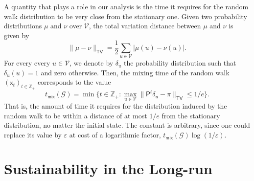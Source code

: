 \documentclass[letterpaper,11pt]{article}
\newcommand{\ZZ}{\mathbb{Z}}
\newcommand{\tv}{\mathsf{TV}}
\newcommand{\tmix}{t_{\mathsf{mix}}}
\newcommand{\psf}{\mathsf{P}}
\newcommand{\xsf}{\mathsf{x}}
\begin{document}
 A quantity that plays a role in our analysis is the time it requires for the random walk distribution to be very close from the stationary one.
Given two probability distributions $\mu$ and $\nu$ over $\mathcal{V}$, the total variation distance between $\mu$ and $\nu$ is given by
\begin{equation}
\|\mu-\nu\|_{\tv}=\frac{1}{2}\sum_{u\in \mathcal{V}}|\mu(u)-\nu(u)|.
\end{equation}
For every every $u\in \mathcal{V}$, we denote by $\delta_u$ the probability distribution such that $\delta_u(u)=1$ and zero otherwise. 
Then, the mixing time of the random walk $(\xsf_t)_{t\in \ZZ_+}$ corresponds to the value
\begin{equation}
\tmix(\mathcal{G})=\min\Big\{t\in \ZZ_+:\max_{u\in \mathcal{V}}\|\psf^t\delta_u-\pi\|_{\tv}\le 1/e\Big\}.
\end{equation}
That is, the amount of time it requires for the distribution induced by the random walk to be within a distance of at most $1/e$ from the stationary distribution, no matter the initial state.
The constant is arbitrary, since one could replace its value by $\varepsilon$ at cost of a logarithmic factor, $\tmix(\mathcal{G})\log(1/\varepsilon)$.

\section{Sustainability in the Long-run}
\end{document}
